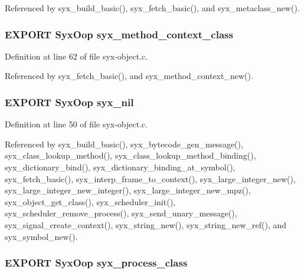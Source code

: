 Referenced by syx\_\-build\_\-basic(), syx\_\-fetch\_\-basic(), and syx\_\-metaclass\_\-new().\hypertarget{syx-object_8h_4273e7a4f4fe7836b8eba627661e2d06}{
\subsubsection{\setlength{\rightskip}{0pt plus 5cm}EXPORT {\bf SyxOop} {\bf syx\_\-method\_\-context\_\-class}}}
\label{syx-object_8h_4273e7a4f4fe7836b8eba627661e2d06}




Definition at line 62 of file syx-object.c.

Referenced by syx\_\-fetch\_\-basic(), and syx\_\-method\_\-context\_\-new().\hypertarget{syx-object_8h_099047c2766cf0dea30c046d58f6f64f}{
\subsubsection{\setlength{\rightskip}{0pt plus 5cm}EXPORT {\bf SyxOop} {\bf syx\_\-nil}}}
\label{syx-object_8h_099047c2766cf0dea30c046d58f6f64f}




Definition at line 50 of file syx-object.c.

Referenced by syx\_\-build\_\-basic(), syx\_\-bytecode\_\-gen\_\-message(), syx\_\-class\_\-lookup\_\-method(), syx\_\-class\_\-lookup\_\-method\_\-binding(), syx\_\-dictionary\_\-bind(), syx\_\-dictionary\_\-binding\_\-at\_\-symbol(), syx\_\-fetch\_\-basic(), syx\_\-interp\_\-frame\_\-to\_\-context(), syx\_\-large\_\-integer\_\-new(), syx\_\-large\_\-integer\_\-new\_\-integer(), syx\_\-large\_\-integer\_\-new\_\-mpz(), syx\_\-object\_\-get\_\-class(), syx\_\-scheduler\_\-init(), syx\_\-scheduler\_\-remove\_\-process(), syx\_\-send\_\-unary\_\-message(), syx\_\-signal\_\-create\_\-context(), syx\_\-string\_\-new(), syx\_\-string\_\-new\_\-ref(), and syx\_\-symbol\_\-new().\hypertarget{syx-object_8h_e3520eeaffb29e4a9780c6e257a022ce}{
\subsubsection{\setlength{\rightskip}{0pt plus 5cm}EXPORT {\bf SyxOop} {\bf syx\_\-process\_\-class}}}
\label{syx-object_8h_e3520eeaffb29e4a9780c6e257a022ce}




